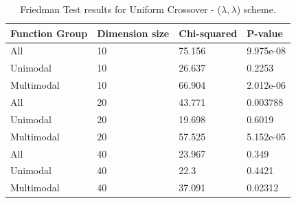 \begin{table}[h]
	\centering
	\begin{tabular}{|l|l|l|l|}
		\hline
		\textbf{Function Group} & \textbf{Dimension size}      & \textbf{Chi-squared}        & \textbf{P-value}                     \\ \hline
		\multicolumn{1}{|l|}{All} & \multicolumn{1}{|l|}{10} & \multicolumn{1}{l|}{75.156} & \multicolumn{1}{l|}{9.975e-08} \\ \hline
		\multicolumn{1}{|l|}{Unimodal} & \multicolumn{1}{|l|}{10} & \multicolumn{1}{l|}{26.637} & \multicolumn{1}{l|}{0.2253} \\ \hline
		\multicolumn{1}{|l|}{Multimodal} & \multicolumn{1}{|l|}{10} & \multicolumn{1}{l|}{66.904} & \multicolumn{1}{l|}{2.012e-06}  \\ \hline
		\hline
		\multicolumn{1}{|l|}{All} & \multicolumn{1}{|l|}{20} & \multicolumn{1}{l|}{43.771} & \multicolumn{1}{l|}{0.003788} \\ \hline
		\multicolumn{1}{|l|}{Unimodal} & \multicolumn{1}{|l|}{20} & \multicolumn{1}{l|}{19.698} & \multicolumn{1}{l|}{0.6019} \\ \hline
		\multicolumn{1}{|l|}{Multimodal} & \multicolumn{1}{|l|}{20} & \multicolumn{1}{l|}{57.525} & \multicolumn{1}{l|}{5.152e-05}  \\ \hline
		\hline	
		\multicolumn{1}{|l|}{All} & \multicolumn{1}{|l|}{40} & \multicolumn{1}{l|}{23.967} & \multicolumn{1}{l|}{0.349} 						\\ \hline
		\multicolumn{1}{|l|}{Unimodal} & \multicolumn{1}{|l|}{40} & \multicolumn{1}{l|}{22.3} & \multicolumn{1}{l|}{0.4421} \\ \hline
		\multicolumn{1}{|l|}{Multimodal} & \multicolumn{1}{|l|}{40} & \multicolumn{1}{l|}{37.091} & \multicolumn{1}{l|}{0.02312}  \\ \hline
	\end{tabular}
	\caption{Friedman Test results for Uniform Crossover - ($\lambda, \lambda$) scheme.}
	\label{Friedman_test_uniform-a}	
\end{table}


